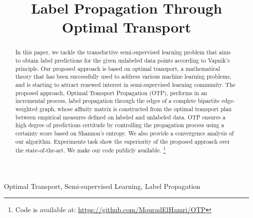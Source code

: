 \documentclass[conference]{IEEEtran}
\begin{document}
\title{Label Propagation Through Optimal Transport\\}

\author{
\and
{}
\and
{}
}
\maketitle
\begin{abstract}
In this paper, we tackle the transductive semi-supervised learning problem that aims to obtain label predictions for the given unlabeled data points according to Vapnik's principle. Our proposed approach is based on optimal transport, a mathematical theory that has been successfully used  to address various machine learning problems, and is starting to attract renewed interest in semi-supervised learning community. The proposed approach, Optimal Transport Propagation (OTP), performs in an incremental process, label propagation through the edges of a complete bipartite edge-weighted graph, whose affinity matrix is constructed from the optimal transport plan between empirical measures defined on labeled and unlabeled data. OTP ensures a high degree of predictions certitude by controlling the propagation process using a certainty score based on Shannon's entropy. We also provide a convergence analysis of our algorithm. Experiments task show the superiority of the proposed approach over the state-of-the-art. We make our code publicly available.
\footnote{Code is available at: \url{https://github.com/MouradElHamri/OTP}} 
\end{abstract}

\begin{IEEEkeywords}
Optimal Transport, Semi-supervised Learning, Label Propagation
\end{IEEEkeywords}
\end{document}
